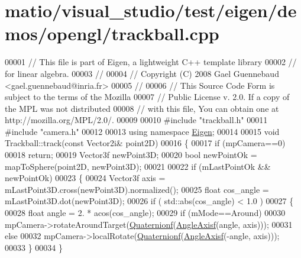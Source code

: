 \hypertarget{matio_2visual__studio_2test_2eigen_2demos_2opengl_2trackball_8cpp_source}{}\section{matio/visual\+\_\+studio/test/eigen/demos/opengl/trackball.cpp}
\label{matio_2visual__studio_2test_2eigen_2demos_2opengl_2trackball_8cpp_source}

\begin{DoxyCode}
00001 \textcolor{comment}{// This file is part of Eigen, a lightweight C++ template library}
00002 \textcolor{comment}{// for linear algebra.}
00003 \textcolor{comment}{//}
00004 \textcolor{comment}{// Copyright (C) 2008 Gael Guennebaud <gael.guennebaud@inria.fr>}
00005 \textcolor{comment}{//}
00006 \textcolor{comment}{// This Source Code Form is subject to the terms of the Mozilla}
00007 \textcolor{comment}{// Public License v. 2.0. If a copy of the MPL was not distributed}
00008 \textcolor{comment}{// with this file, You can obtain one at http://mozilla.org/MPL/2.0/.}
00009 
00010 \textcolor{preprocessor}{#include "trackball.h"}
00011 \textcolor{preprocessor}{#include "camera.h"}
00012 
00013 \textcolor{keyword}{using namespace }\hyperlink{namespace_eigen}{Eigen};
00014 
00015 \textcolor{keywordtype}{void} Trackball::track(\textcolor{keyword}{const} Vector2i& point2D)
00016 \{
00017   \textcolor{keywordflow}{if} (mpCamera==0)
00018     \textcolor{keywordflow}{return};
00019   Vector3f newPoint3D;
00020   \textcolor{keywordtype}{bool} newPointOk = mapToSphere(point2D, newPoint3D);
00021 
00022   \textcolor{keywordflow}{if} (mLastPointOk && newPointOk)
00023   \{
00024     Vector3f axis = mLastPoint3D.cross(newPoint3D).normalized();
00025     \textcolor{keywordtype}{float} cos\_angle = mLastPoint3D.dot(newPoint3D);
00026     \textcolor{keywordflow}{if} ( std::abs(cos\_angle) < 1.0 )
00027     \{
00028       \textcolor{keywordtype}{float} angle = 2. * acos(cos\_angle);
00029       \textcolor{keywordflow}{if} (mMode==Around)
00030         mpCamera->rotateAroundTarget(\hyperlink{group___geometry___module_ga785b13a5a87f9bf55d4eba51ead2dcf0}{Quaternionf}(\hyperlink{group___geometry___module_gadc7128416da41ca99bb8af814b78599e}{AngleAxisf}(angle, axis)));
00031       \textcolor{keywordflow}{else}
00032         mpCamera->localRotate(\hyperlink{group___geometry___module_ga785b13a5a87f9bf55d4eba51ead2dcf0}{Quaternionf}(\hyperlink{group___geometry___module_gadc7128416da41ca99bb8af814b78599e}{AngleAxisf}(-angle, axis)));
00033     \}
00034   \}

\end{DoxyCode}
